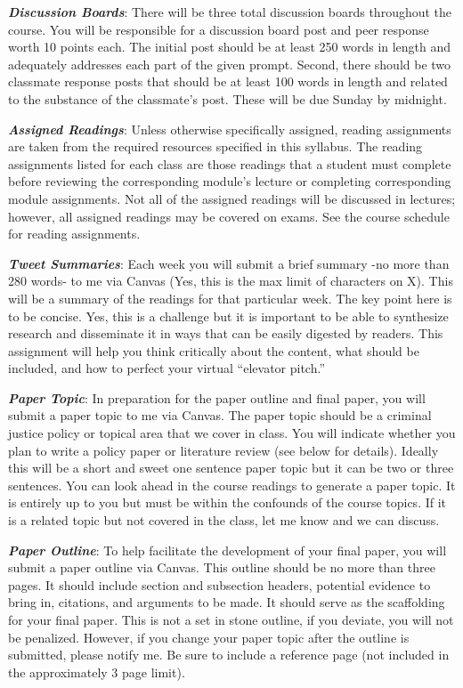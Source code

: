 \documentclass[11pt,]{article}
\begin{document}
\textbf{\emph{Discussion Boards}}: There will be three total discussion
boards throughout the course. You will be responsible for a discussion
board post and peer response worth 10 points each. The initial post
should be at least 250 words in length and adequately addresses each
part of the given prompt. Second, there should be two classmate response
posts that should be at least 100 words in length and related to the
substance of the classmate's post. These will be due Sunday by midnight.

\textbf{\emph{Assigned Readings}}: Unless otherwise specifically
assigned, reading assignments are taken from the required resources
specified in this syllabus. The reading assignments listed for each
class are those readings that a student must complete before reviewing
the corresponding module's lecture or completing corresponding module
assignments. Not all of the assigned readings will be discussed in
lectures; however, all assigned readings may be covered on exams. See
the course schedule for reading assignments.

\textbf{\emph{Tweet Summaries}}: Each week you will submit a brief
summary -no more than 280 words- to me via Canvas (Yes, this is the max
limit of characters on X). This will be a summary of the readings for
that particular week. The key point here is to be concise. Yes, this is
a challenge but it is important to be able to synthesize research and
disseminate it in ways that can be easily digested by readers. This
assignment will help you think critically about the content, what should
be included, and how to perfect your virtual ``elevator pitch.''

\textbf{\emph{Paper Topic}}: In preparation for the paper outline and
final paper, you will submit a paper topic to me via Canvas. The paper
topic should be a criminal justice policy or topical area that we cover
in class. You will indicate whether you plan to write a policy paper or
literature review (see below for details). Ideally this will be a short
and sweet one sentence paper topic but it can be two or three sentences.
You can look ahead in the course readings to generate a paper topic. It
is entirely up to you but must be within the confounds of the course
topics. If it is a related topic but not covered in the class, let me
know and we can discuss.

\textbf{\emph{Paper Outline}}: To help facilitate the development of
your final paper, you will submit a paper outline via Canvas. This
outline should be no more than three pages. It should include section
and subsection headers, potential evidence to bring in, citations, and
arguments to be made. It should serve as the scaffolding for your final
paper. This is not a set in stone outline, if you deviate, you will not
be penalized. However, if you change your paper topic after the outline
is submitted, please notify me. Be sure to include a reference page (not
included in the approximately 3 page limit).
\end{document}
